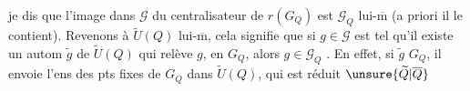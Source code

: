 je dis que l'image dans $\mathcal G$ du centralisateur  de $r(G_Q)$ est $\mathcal G_Q$ lui-$\overline{\mathrm m}$ (a priori il le contient).
Revenons à $\widetilde U(Q)$ lui-$\overline{\mathrm m}$, cela signifie que  si $g\in\mathcal G$ est tel qu'il existe un autom $\widetilde g$ de $\widetilde U(Q)$ qui relève $g$, en     $G_Q$, alors $g\in\mathcal G_Q$ . En effet, si $\widetilde g$    $G_Q$, il envoie l'ens des pts fixes de $G_Q$ dans $\widetilde U(Q)$, qui est réduit   $\unsure{\widetilde Q|\overline Q}$
